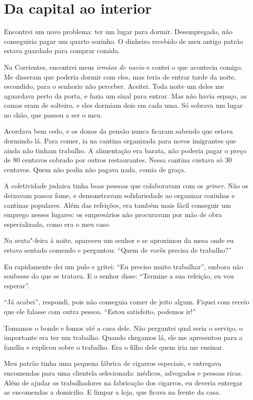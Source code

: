 \chapter{Da capital ao interior}

Encontrei um novo problema: ter um lugar para dormir. 
Desempregado, não conseguiria pagar um quarto sozinho. O dinheiro recebido de meu antigo 
patrão estava guardado para comprar comida.

Na Corrientes, encontrei meus \textit{irmãos de navio} e contei o 
que acontecia comigo. Me disseram que poderia dormir com eles, mas teria de
entrar tarde da noite, escondido, para o senhorio não perceber. Aceitei. Toda noite um deles me aguardava perto da porta, 
e fazia um sinal para entrar. Mas não havia espaço, as camas
eram de solteiro, e eles dormiam dois em cada uma. Só sobrava um lugar
no chão, que passou a ser o meu.

Acordava bem cedo, e os donos da pensão nunca ficaram sabendo que estava
dormindo lá. Para comer, ia na cantina organizada 
para novos imigrantes que ainda não tinham trabalho. A alimentação 
era barata, não poderia pagar o preço de
80 centavos cobrado por outros restaurantes. Nessa cantina custava só 30
centavos. Quem não podia não pagava nada, comia de graça.

A coletividade judaica tinha boas pessoas que colaboravam com os
\textit{griner}. Não os deixavam passar fome, e demonstravam solidariedade 
ao organizar cozinhas e cantinas populares. Além das refeições, era também mais
fácil conseguir um emprego nesses lugares: os empresários
não procuravam por mão de obra especializada, como era o meu caso.

Na sexta"-feira à noite, apareceu um senhor e se aproximou da mesa onde
eu estava sentado comendo e perguntou: ``Quem de vocês precisa de trabalho?''

Eu rapidamente dei um pulo e gritei: ``Eu preciso muito trabalhar'', embora não soubesse do que se tratava. E o senhor disse: ``Termine a sua refeição, eu vou esperar''.

``Já acabei'', respondi, pois não conseguia comer de jeito algum. Fiquei
com receio que ele falasse com outra pessoa. ``Estou satisfeito, podemos
ir!''

Tomamos o bonde e fomos até a casa dele. Não perguntei qual
seria o serviço, o importante era ter um trabalho. Quando
chegamos lá, ele me apresentou para a família e explicou sobre o
trabalho. Era o filho dele quem iria me ensinar.

Meu patrão tinha uma pequena fábrica de cigarros especiais, e
entregava encomendas para uma clientela selecionada: médicos,
advogados e pessoas ricas. Além de ajudar os trabalhadores na fabricação
dos cigarros, eu deveria entregar as encomendas a domicilio. E
limpar a loja, que ficava na frente da casa.

